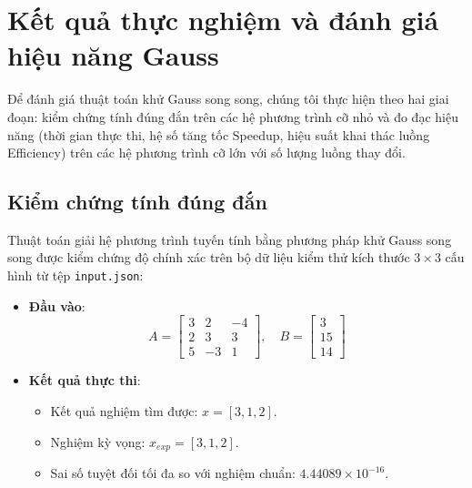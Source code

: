 \section{Kết quả thực nghiệm và đánh giá hiệu năng Gauss}

Để đánh giá thuật toán khử Gauss song song, chúng tôi thực hiện theo hai giai đoạn: kiểm chứng tính đúng đắn trên các hệ phương trình cỡ nhỏ và đo đạc hiệu năng (thời gian thực thi, hệ số tăng tốc Speedup, hiệu suất khai thác luồng Efficiency) trên các hệ phương trình cỡ lớn với số lượng luồng thay đổi.

\subsection{Kiểm chứng tính đúng đắn}
Thuật toán giải hệ phương trình tuyến tính bằng phương pháp khử Gauss song song được kiểm chứng độ chính xác trên bộ dữ liệu kiểm thử kích thước $3 \times 3$ cấu hình từ tệp \texttt{input.json}:
\begin{itemize}
  \item \textbf{Đầu vào}:
        \[
          A = \begin{bmatrix}
            3 & 2  & -4 \\
            2 & 3  & 3  \\
            5 & -3 & 1
          \end{bmatrix}, \quad
          B = \begin{bmatrix}
            3 \\ 15 \\ 14
          \end{bmatrix}
        \]
  \item \textbf{Kết quả thực thi}:
        \begin{itemize}
          \item Kết quả nghiệm tìm được: $x = [3, 1, 2]$.
          \item Nghiệm kỳ vọng: $x_{exp} = [3, 1, 2]$.
          \item Sai số tuyệt đối tối đa so với nghiệm chuẩn: $4.44089 \times 10^{-16}$.
        \end{itemize}
\end{itemize}

